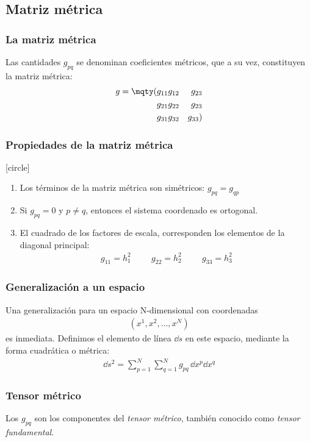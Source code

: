 \subsection{Matriz métrica}
\begin{frame}
\frametitle{La matriz métrica}
Las cantidades $g_{pq}$ se denominan coeficientes métricos, que a su vez, constituyen la matriz métrica:
\begin{align*}
g = \mqty(
g_{11} & g_{12} & g_{23} \\
g_{21} & g_{22} & g_{23} \\
g_{31} & g_{32} & g_{33}
)
\end{align*}
\end{frame}
\begin{frame}
\frametitle{Propiedades de la matriz métrica}
[circle]
\begin{enumerate}[<+->]
\item Los términos de la matriz métrica son simétricos: $g_{pq} = g_{qp}$
\item Si $g_{pq} = 0$ y $p \neq q$, entonces el sistema coordenado es ortogonal.
\item El cuadrado de los factores de escala, corresponden los elementos de la diagonal principal:
\begin{align*}
g_{11} = h_{1}^{2} \hspace{1cm} g_{22} = h_{2}^{2} \hspace{1cm} g_{33} = h_{3}^{2}
\end{align*}
\end{enumerate}
\end{frame}
\begin{frame}
\frametitle{Generalización a un espacio}
Una generalización para un espacio N-dimensional con coordenadas
\begin{align*}
(x^{1}, x^{2}, \ldots, x^{N})
\end{align*}
es inmediata. Definimos el elemento de línea $\dd{s}$ en este espacio, mediante la forma cuadrática o métrica:
\begin{align*}
\dd{s^{2}} = \sum_{p=1}^{N} \sum_{q=1}^{N} g_{pq} \, \dd{x^{p}} \dd{x^{q}}
\end{align*}
\end{frame}
\begin{frame}
\frametitle{Tensor métrico}
Los $g_{pq}$ son los componentes del \emph{tensor métrico}, también conocido como \emph{tensor fundamental}. 
\end{frame}

